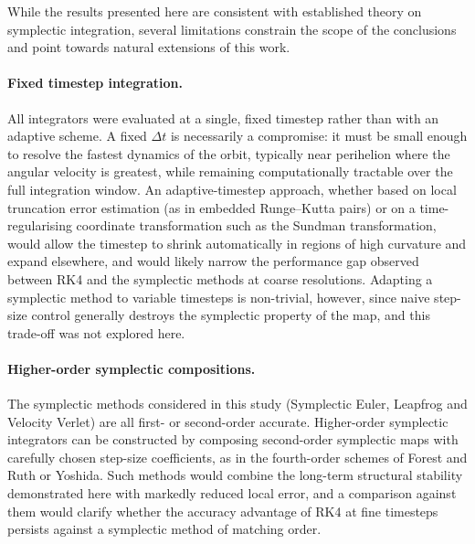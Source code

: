 While the results presented here are consistent with established theory on symplectic integration, several
limitations constrain the scope of the conclusions and point towards natural extensions of this work.

\paragraph{Fixed timestep integration.} All integrators were evaluated at a single, fixed timestep rather than
with an adaptive scheme. A fixed $\Delta t$ is necessarily a compromise: it must be small enough to resolve
the fastest dynamics of the orbit, typically near perihelion where the angular velocity is greatest, while
remaining computationally tractable over the full integration window. An adaptive-timestep approach, whether
based on local truncation error estimation (as in embedded Runge--Kutta pairs) or on a time-regularising
coordinate transformation such as the Sundman transformation, would allow the timestep to shrink automatically
in regions of high curvature and expand elsewhere, and would likely narrow the performance gap observed
between RK4 and the symplectic methods at coarse resolutions. Adapting a symplectic method to variable
timesteps is non-trivial, however, since naive step-size control generally destroys the symplectic property
of the map, and this trade-off was not explored here.

\paragraph{Higher-order symplectic compositions.} The symplectic methods considered in this study (Symplectic
Euler, Leapfrog and Velocity Verlet) are all first- or second-order accurate. Higher-order symplectic
integrators can be constructed by composing second-order symplectic maps with carefully chosen step-size
coefficients, as in the fourth-order schemes of Forest and Ruth or Yoshida. Such methods would combine the
long-term structural stability demonstrated here with markedly reduced local error, and a comparison against
them would clarify whether the accuracy advantage of RK4 at fine timesteps persists against a symplectic method
of matching order.


